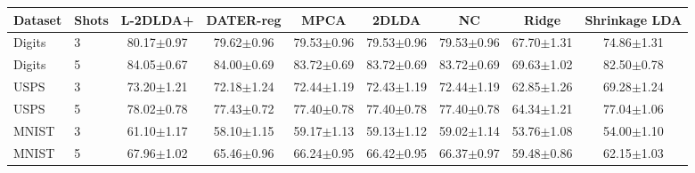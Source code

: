 \begin{tabular}{llccccccc}
\toprule
Dataset & Shots & L-2DLDA+ & DATER-reg & MPCA & 2DLDA & NC & Ridge & Shrinkage LDA \\
\midrule
Digits & 3 & 80.17$\pm$0.97 & 79.62$\pm$0.96 & 79.53$\pm$0.96 & 79.53$\pm$0.96 & 79.53$\pm$0.96 & 67.70$\pm$1.31 & 74.86$\pm$1.31 \\
Digits & 5 & 84.05$\pm$0.67 & 84.00$\pm$0.69 & 83.72$\pm$0.69 & 83.72$\pm$0.69 & 83.72$\pm$0.69 & 69.63$\pm$1.02 & 82.50$\pm$0.78 \\
USPS & 3 & 73.20$\pm$1.21 & 72.18$\pm$1.24 & 72.44$\pm$1.19 & 72.43$\pm$1.19 & 72.44$\pm$1.19 & 62.85$\pm$1.26 & 69.28$\pm$1.24 \\
USPS & 5 & 78.02$\pm$0.78 & 77.43$\pm$0.72 & 77.40$\pm$0.78 & 77.40$\pm$0.78 & 77.40$\pm$0.78 & 64.34$\pm$1.21 & 77.04$\pm$1.06 \\
MNIST & 3 & 61.10$\pm$1.17 & 58.10$\pm$1.15 & 59.17$\pm$1.13 & 59.13$\pm$1.12 & 59.02$\pm$1.14 & 53.76$\pm$1.08 & 54.00$\pm$1.10 \\
MNIST & 5 & 67.96$\pm$1.02 & 65.46$\pm$0.96 & 66.24$\pm$0.95 & 66.42$\pm$0.95 & 66.37$\pm$0.97 & 59.48$\pm$0.86 & 62.15$\pm$1.03 \\
\bottomrule
\end{tabular}

